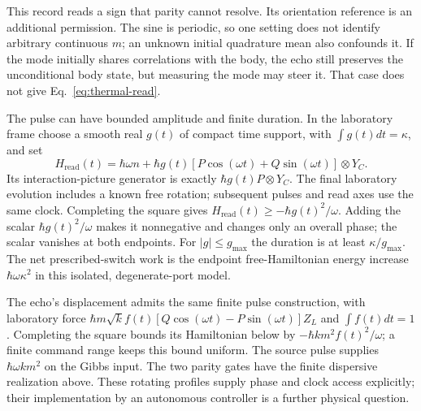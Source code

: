 \documentclass[aps,pre,onecolumn,superscriptaddress,floatfix,longbibliography]{revtex4-2}
\begin{document}
This record reads a sign that parity cannot resolve. Its orientation
reference is an additional permission. The sine is periodic, so one setting
does not identify arbitrary continuous $m$; an unknown initial quadrature
mean also confounds it. If the mode initially shares correlations with the
body, the echo still preserves the unconditional body state, but measuring
the mode may steer it. That case does not give Eq.~\eqref{eq:thermal-read}.

The pulse can have bounded amplitude and finite duration. In the laboratory
frame choose a smooth real $g(t)$ of compact time support, with
$\int g(t)dt=\kappa$, and set
\begin{equation}\label{eq:thermal-read-H}
 H_{\mathrm{read}}(t)=\hbar\omega n+
 \hbar g(t)[P\cos(\omega t)+Q\sin(\omega t)]\otimes Y_C.
\end{equation}
Its interaction-picture generator is exactly $\hbar g(t)P\otimes Y_C$.
The final laboratory evolution includes a known free rotation; subsequent
pulses and read axes use the same clock. Completing the square gives
$H_{\mathrm{read}}(t)\ge-\hbar g(t)^2/\omega$.
Adding the scalar $\hbar g(t)^2/\omega$ makes it nonnegative and changes
only an overall phase; the scalar vanishes at both endpoints.
For $|g|\le g_{\max}$ the duration is at least $\kappa/g_{\max}$.
The net prescribed-switch work is the endpoint free-Hamiltonian energy increase
$\hbar\omega\kappa^2$ in this isolated, degenerate-port model.

The echo's displacement admits the same finite pulse construction, with
laboratory force $\hbar m\sqrt{k}f(t)
[Q\cos(\omega t)-P\sin(\omega t)]Z_L$ and
$\int f(t)dt=1$. Completing the square bounds its Hamiltonian below by
$-\hbar km^2f(t)^2/\omega$; a finite command range keeps this bound uniform.
The source pulse supplies $\hbar\omega km^2$ on the Gibbs input.
The two parity gates have the finite dispersive realization above.
These rotating profiles supply phase and clock access explicitly; their
implementation by an autonomous controller is a further physical question.
\end{document}
